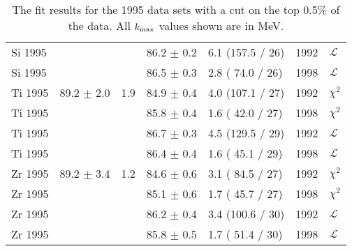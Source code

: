 \begin{table}[h]
\begin{center}
\begin{tabular}{|l||l|l|l|l|l|l|}
      Si 1995 &                &     & 86.2 $\pm$ 0.2 & 6.1 (157.5 / 26) & 1992 & $\mathcal{L}$ \\
      Si 1995 &                &     & 86.5 $\pm$ 0.3 & 2.8 ( 74.0 / 26) & 1998 & $\mathcal{L}$ \\
      \hline
      Ti 1995 & 89.2 $\pm$ 2.0 & 1.9 & 84.9 $\pm$ 0.4 & 4.0 (107.1 / 27) & 1992 & $\chi^2$ \\
      Ti 1995 &                &     & 85.8 $\pm$ 0.4 & 1.6 ( 42.0 / 27) & 1998 & $\chi^2$ \\
      Ti 1995 &                &     & 86.7 $\pm$ 0.3 & 4.5 (129.5 / 29) & 1992 & $\mathcal{L}$ \\
      Ti 1995 &                &     & 86.4 $\pm$ 0.4 & 1.6 ( 45.1 / 29) & 1998 & $\mathcal{L}$ \\
      \hline
      Zr 1995 & 89.2 $\pm$ 3.4 & 1.2 & 84.6 $\pm$ 0.6 & 3.1 ( 84.5 / 27) & 1992 & $\chi^2$ \\
      Zr 1995 &                &     & 85.1 $\pm$ 0.6 & 1.7 ( 45.7 / 27) & 1998 & $\chi^2$ \\
      Zr 1995 &                &     & 86.2 $\pm$ 0.4 & 3.4 (100.6 / 30) & 1992 & $\mathcal{L}$ \\
      Zr 1995 &                &     & 85.8 $\pm$ 0.5 & 1.7 ( 51.4 / 30) & 1998 & $\mathcal{L}$ \\
      \hline
                                                                                
    \end{tabular}
  \end{center}
  \caption{The fit results for the 1995 data sets with a cut on the top 0.5\% of the data. All $\mbox{$k_{\rm max}$}$ values shown are in MeV.}
  \label{table:fits1995}
\end{table}



